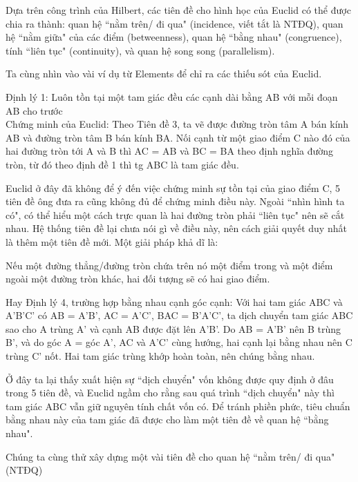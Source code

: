 \begin{multicols}{2}
	Dựa trên công trình của Hilbert, các tiên đề cho hình học của Euclid có thể được chia ra thành: quan hệ ``nằm trên/ đi qua" (incidence, viết tắt là NTĐQ), quan hệ ``nằm giữa" của các điểm (betweenness), quan hệ ``bằng nhau" (congruence), tính ``liên tục" (continuity), và quan hệ song song (parallelism). 
	
	Ta cùng nhìn vào vài ví dụ từ Elements để chỉ ra các thiếu sót của Euclid. 
	
	Định lý 1: Luôn tồn tại một tam giác đều các cạnh dài bằng AB với mỗi đoạn AB cho trước \\
	Chứng minh của Euclid: Theo Tiên đề 3, ta vẽ được đường tròn tâm A bán kính AB và đường tròn tâm B bán kính BA. Nối cạnh từ một giao điểm C nào đó của hai đường tròn tới A và B thì AC = AB và BC = BA theo định nghĩa đường tròn, từ đó theo định đề 1 thì tg ABC là tam giác đều.
	
	Euclid ở đây đã không để ý đến việc chứng minh sự tồn tại của giao điểm C, 5 tiên đề ông đưa ra cũng không đủ để chứng minh điều này. Ngoài ``nhìn hình ta có", có thể hiểu một cách trực quan là hai đường tròn phải ``liên tục" nên sẽ cắt nhau. Hệ thống tiên đề lại chưa nói gì về điều này, nên cách giải quyết duy nhất là thêm một tiên đề mới. Một giải pháp khả dĩ là:
	
	Nếu một đường thẳng/đường tròn chứa trên nó một điểm trong và một điểm ngoài một đường tròn khác, hai đối tượng sẽ có hai giao điểm.
	
	Hay Định lý 4, trường hợp bằng nhau cạnh góc cạnh: Với hai tam giác ABC và A’B’C’ có AB = A’B’, AC = A’C’, BAC = B’A’C’, ta dịch chuyển tam giác ABC sao cho A trùng A’ và cạnh AB được đặt lên A’B’. Do AB = A’B’ nên B trùng B’, và do góc A = góc A’, AC và A’C’ cùng hướng, hai cạnh lại bằng nhau nên C trùng C’ nốt. Hai tam giác trùng khớp hoàn toàn, nên chúng bằng nhau.
	
	Ở đây ta lại thấy xuất hiện sự ``dịch chuyển" vốn không được quy định ở đâu trong 5 tiên đề, và Euclid ngầm cho rằng sau quá trình ``dịch chuyển" này thì tam giác ABC vẫn giữ nguyên tính chất vốn có. Để tránh phiền phức, tiêu chuẩn bằng nhau này của tam giác đã được cho làm một tiên đề về quan hệ ``bằng nhau".
	
	Chúng ta cùng thử xây dựng một vài tiên đề cho quan hệ ``nằm trên/ đi qua" (NTĐQ)
	

\end{multicols}
